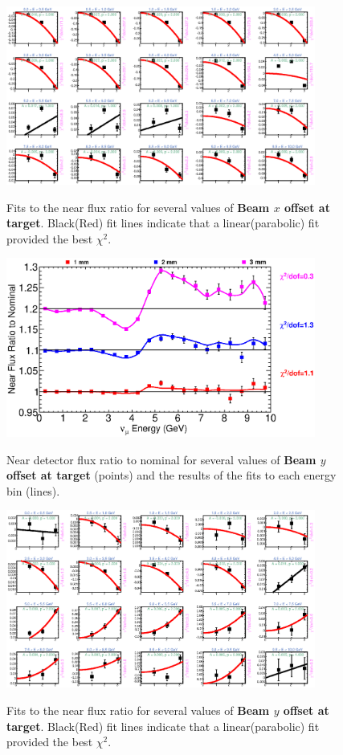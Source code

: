 \begin{figure}[hb]
  \begin{center}
    {\includegraphics[width=4.0in]{figures/NominalX_near_fits.eps}}
  \end{center}
\caption{ Fits to the near flux ratio for several values of {\bf Beam $x$ offset at target}. Black(Red) fit lines indicate that a linear(parabolic) fit provided the best $\chi^2$. }
\end{figure}

\begin{figure}[ht]
  \begin{center}
    {\includegraphics[width=4.0in]{figures/NominalY_near_summary.eps}}
  \end{center}
\caption{ Near detector flux ratio to nominal for several values of {\bf Beam $y$ offset at target} (points) and the results of the fits to each energy bin (lines).}
\end{figure}

\begin{figure}[hb]
  \begin{center}
    {\includegraphics[width=4.0in]{figures/NominalY_near_fits.eps}}
  \end{center}
\caption{ Fits to the near flux ratio for several values of {\bf Beam $y$ offset at target}. Black(Red) fit lines indicate that a linear(parabolic) fit provided the best $\chi^2$. }
\end{figure}

